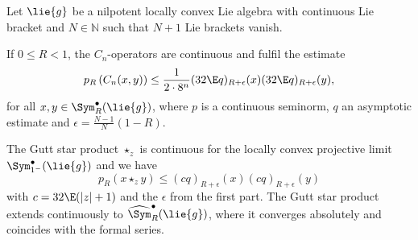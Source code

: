 \begin{theorem}
    \label{Nilpot:Thm:ProjLimit}%
    Let $\lie{g}$ be a nilpotent locally convex Lie algebra with
    continuous Lie bracket and $N \in \mathbb{N}$ such that $N + 1$
    Lie brackets vanish.
    \begin{theoremlist}
	    	\item \label{item:Nilpot:CnOperators}
	    	If $0 \leq R < 1$, the $C_n$-operators are continuous and fulfil the 
	    	estimate
	    	\begin{equation}
	    		\label{eq:Nilpot:CnOperators}
	    		p_R \left(
	    			C_n (x, y)
	    		\right)
	    		\leq
	    		\frac{1}{2 \cdot 8^n}
	    		(32 \E q)_{R + \epsilon}(x)
	    		(32 \E q)_{R + \epsilon}(y),
	    	\end{equation}
	    	for all $x, y \in \Sym_R^{\bullet}(\lie{g})$, where $p$ is a 
	    	continuous seminorm, $q$ an asymptotic estimate and 
	    	$\epsilon = \frac{N - 1}{N}(1 - R)$.
	    	
	    	\item \label{item_Nilpot:SEinsMinus}
	    	The Gutt star product $\star_z$ is continuous for the locally convex 
	    	projective limit $\Sym_{1^-}^\bullet(\lie{g})$ and we have
	    	\begin{equation}
	    		\label{eq:Nilpot:Continuity}
	    		p_R \left(
	    			x \star_z y
	    		\right)
	    		\leq
	    		(c q)_{R + \epsilon}(x)
	    		(c q)_{R + \epsilon}(y)
	    	\end{equation}
	    	with $c = 32 \E (|z| +1)$ and the $\epsilon$ from the first part.
	    	The Gutt star product extends continuously to
	    	$\widehat{\Sym}_R^{\bullet}(\lie{g})$, where it converges absolutely 
	    	and coincides with the formal series.
    \end{theoremlist}
\end{theorem}
